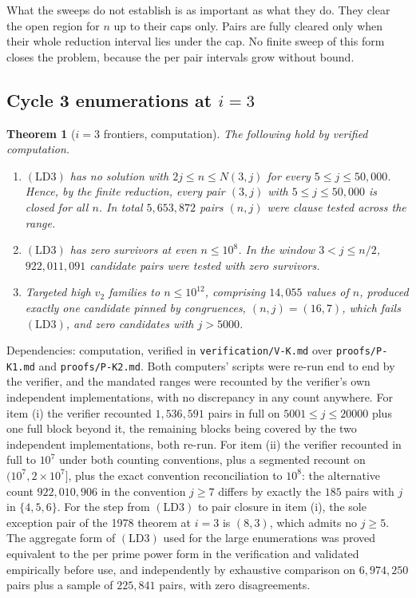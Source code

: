 \documentclass[11pt]{article}
\newtheorem{theorem}{Theorem}[section]
\theoremstyle{remark}
\newcommand{\LDthree}{\ensuremath{\mathrm{(LD3)}}}
\begin{document}
What the sweeps do not establish is as important as what they do. They clear the open region for $n$ up to their caps only. Pairs are fully cleared only when their whole reduction interval lies under the cap. No finite sweep of this form closes the problem, because the per pair intervals grow without bound.

\subsection{Cycle 3 enumerations at $i=3$}

\begin{theorem}[$i=3$ frontiers, computation]
\label{thm:frontier3}
The following hold by verified computation.
\begin{enumerate}[label=(\roman*),leftmargin=2.5em]
\item \LDthree{} has no solution with $2j\le n\le N(3,j)$ for every $5\le j\le 50{,}000$. Hence, by the finite reduction, every pair $(3,j)$ with $5\le j\le 50{,}000$ is closed for all $n$. In total $5{,}653{,}872$ pairs $(n,j)$ were clause tested across the range.
\item \LDthree{} has zero survivors at even $n\le 10^8$. In the window $3<j\le n/2$, $922{,}011{,}091$ candidate pairs were tested with zero survivors.
\item Targeted high $v_2$ families to $n\le 10^{12}$, comprising $14{,}055$ values of $n$, produced exactly one candidate pinned by congruences, $(n,j)=(16,7)$, which fails \LDthree{}, and zero candidates with $j>5000$.
\end{enumerate}
\end{theorem}

Dependencies: computation, verified in \texttt{verification/V-K.md} over \texttt{proofs/P-K1.md} and \texttt{proofs/P-K2.md}. Both computers' scripts were re-run end to end by the verifier, and the mandated ranges were recounted by the verifier's own independent implementations, with no discrepancy in any count anywhere. For item (i) the verifier recounted $1{,}536{,}591$ pairs in full on $5001\le j\le 20000$ plus one full block beyond it, the remaining blocks being covered by the two independent implementations, both re-run. For item (ii) the verifier recounted in full to $10^7$ under both counting conventions, plus a segmented recount on $(10^7,2\times 10^7]$, plus the exact convention reconciliation to $10^8$: the alternative count $922{,}010{,}906$ in the convention $j\ge 7$ differs by exactly the $185$ pairs with $j$ in $\{4,5,6\}$. For the step from \LDthree{} to pair closure in item (i), the sole exception pair of the 1978 theorem at $i=3$ is $(8,3)$, which admits no $j\ge 5$. The aggregate form of \LDthree{} used for the large enumerations was proved equivalent to the per prime power form in the verification and validated empirically before use, and independently by exhaustive comparison on $6{,}974{,}250$ pairs plus a sample of $225{,}841$ pairs, with zero disagreements.
\end{document}
